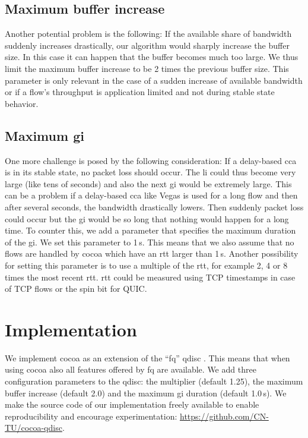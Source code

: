 \documentclass[10pt,sigconf,letterpaper,dvipsnames\ifx\removeHeaders\tempYes ,nonacm\fi]{acmart}
\begin{document}
\subsection{Maximum buffer increase}

Another potential problem is the following: If the available share of bandwidth suddenly increases drastically, our algorithm would sharply increase the buffer size. In this case it can happen that the buffer becomes much too large. We thus limit the maximum buffer increase to be 2 times the previous buffer size. This parameter is only relevant in the case of a sudden increase of available bandwidth or if a flow's throughput is application limited and not during stable state behavior. 

\subsection{Maximum \gls{gi}}

One more challenge is posed by the following consideration: If a delay-based \gls{cca} is in its stable state, no packet loss should occur. The \gls{li} could thus become very large (like tens of seconds) and also the next \gls{gi} would be extremely large. This can be a problem if a delay-based \gls{cca} like Vegas \cite{brakmo_tcp_1995} is used for a long flow and then after several seconds, the bandwidth drastically lowers. Then suddenly packet loss could occur but the \gls{gi} would be so long that nothing would happen for a long time. To counter this, we add a parameter that specifies the maximum duration of the \gls{gi}. We set this parameter to 1\,s. This means that we also assume that no flows are handled by \gls{cocoa} which have an \gls{rtt} larger than 1\,s. Another possibility for setting this parameter is to use a multiple of the \gls{rtt}, for example 2, 4 or 8 times the most recent \gls{rtt}. \gls{rtt} could be measured using TCP timestamps \cite{borman_tcp_2014} in case of TCP flows or the spin bit \cite{kuhlewind_quic_2018} for QUIC. 

\section{Implementation}

We implement \gls{cocoa} as an extension of the ``fq'' \gls{qdisc} \cite{dumazet_pkt_sched:_2013}. This means that when using \gls{cocoa} also all features offered by fq are available. We add three configuration parameters to the \gls{qdisc}: the multiplier (default 1.25), the maximum buffer increase (default 2.0) and the maximum \gls{gi} duration (default 1.0\,s). We make the source code of our implementation freely available to enable reproducibility and encourage experimentation: \url{https://github.com/CN-TU/cocoa-qdisc}.
\end{document}
